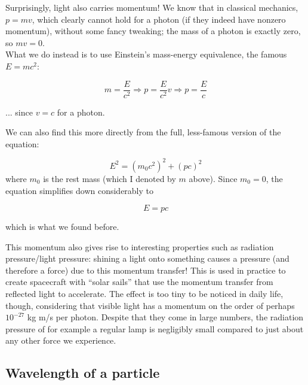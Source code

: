 \documentclass[8.01x]{subfiles}
\begin{document}
Surprisingly, light also carries momentum! We know that in classical mechanics, $p = m v$, which clearly cannot hold for a photon (if they indeed have nonzero momentum), without some fancy tweaking; the mass of a photon is exactly zero, so $m v = 0$.\\
What we do instead is to use Einstein's mass-energy equivalence, the famous $E = m c^2$:

\begin{equation}
m = \frac{E}{c^2} \Rightarrow p = \frac{E}{c^2} v \Rightarrow p = \frac{E}{c}
\end{equation}

... since $v = c$ for a photon.

We can also find this more directly from the full, less-famous version of the equation:

\begin{equation}
E^2 = (m_0 c^2)^2 + (p c)^2
\end{equation}
where $m_0$ is the rest mass (which I denoted by $m$ above). Since $m_0 = 0$, the equation simplifies down considerably to

\begin{equation}
E = p c
\end{equation}

which is what we found before.

This momentum also gives rise to interesting properties such as radiation pressure/light pressure: shining a light onto something causes a pressure (and therefore a force) due to this momentum transfer! This is used in practice to create spacecraft with ``solar sails'' that use the momentum transfer from reflected light to accelerate. The effect is too tiny to be noticed in daily life, though, considering that visible light has a momentum on the order of perhaps $10^{-27}$ kg m/s per photon. Despite that they come in large numbers, the radiation pressure of for example a regular lamp is negligibly small compared to just about any other force we experience.

\subsection{Wavelength of a particle}
\end{document}

